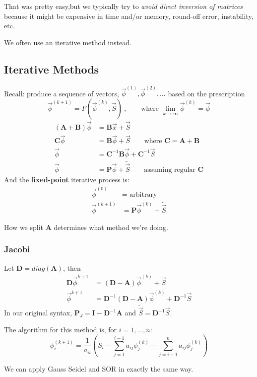 \documentclass[12pt]{article}
\newcommand{\ve}[1]{\ensuremath{\mathbf{#1}}}
\begin{document}
That was pretty easy,but we typically try to \textit{avoid direct inversion of matrices} because it might be expensive in time and/or memory, round-off error, instability, etc.

We often use an iterative method instead. 


\subsection{Iterative Methods}

Recall: produce a sequence of vectors, $\vec{\phi}^{(1)}, \vec{\phi}^{(2)}, \dots$ based on the prescription
  \[\vec{\phi}^{(k+1)} = F(\vec{\phi}^{(k)}, \vec{S})\:, \qquad \text{where } \displaystyle \lim_{k \rightarrow \infty} \vec{\phi}^{(k)} = \vec{\phi}\] 
%
\begin{align}
(\ve{A} + \ve{B}) \vec{\phi} &= \ve{B}\vec{x} + \vec{S} \nonumber \\
%
\ve{C} \vec{\phi} &= \ve{B}\vec{\phi} + \vec{S} 
\qquad\text{where } \ve{C} = \ve{A} + \ve{B} \nonumber \\
%
\vec{\phi} &= \ve{C}^{-1} \ve{B}\vec{\phi} + \ve{C}^{-1} \vec{S} 
\nonumber \\
%
\vec{\phi} &= \ve{P}\vec{\phi} + \tilde{\vec{S}}  
\qquad\text{assuming regular } \ve{C}\nonumber
\end{align}
%
And the \textbf{fixed-point} iterative process is:
\begin{align}
\vec{\phi}^{(0)} &= \text{ arbitrary}\nonumber \\
\vec{\phi}^{(k+1)} &= \ve{P}\vec{\phi}^{(k)} + \tilde{\vec{S}} \nonumber
\end{align}

How we split $\ve{A}$ determines what method we're doing.

\subsubsection{Jacobi}

Let $\ve{D} = diag(\ve{A})$, then
\begin{align}
\ve{D} \vec{\phi}^{k+1} &= (\ve{D} - \ve{A})\vec{\phi}^{(k)} + \vec{S} \nonumber \\
%
\vec{\phi}^{k+1} &= \ve{D}^{-1}(\ve{D} - \ve{A})\vec{\phi}^{(k)} + \ve{D}^{-1}\vec{S} \nonumber
\end{align}
%
In our original syntax, $\ve{P}_J = \ve{I} -  \ve{D}^{-1}\ve{A}$ and $\tilde{\vec{S}} =\ve{D}^{-1}\vec{S}$.

The algorithm for this method is, for $i = 1, \dots, n$:
\[ \phi^{(k+1)}_i = \frac{1}{a_{ii}}(S_i - \sum_{j=1}^{i-1} a_{ij} \phi_j^{(k)} - \sum_{j=i+1}^{n} a_{ij} \phi_j^{(k)})\]

We can apply Gauss Seidel and SOR in exactly the same way. 




%
% 
\end{document}
